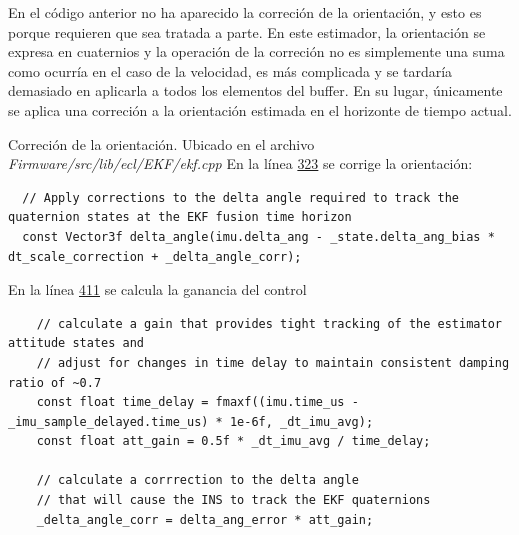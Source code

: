 En el código anterior no ha aparecido la correción de la orientación, y esto es porque requieren que sea tratada a parte. En este estimador, la orientación se expresa en cuaternios y la operación de la correción no es simplemente una suma como ocurría en el caso de la velocidad, es más complicada y se tardaría demasiado en aplicarla a todos los elementos del buffer. En su lugar, únicamente se aplica una correción a la orientación estimada en el horizonte de tiempo actual.

\begin{codigo}{Correción de la orientación. Ubicado en el archivo \textit{Firmware/src/lib/ecl/EKF/ekf.cpp}}
En la línea \href{https://github.com/PX4/PX4-ECL/blob/ec934908900b23ee273d1a9f82364b7b38423200/EKF/ekf.cpp\#L323}{323} se corrige la orientación:
\begin{verbatim}
  // Apply corrections to the delta angle required to track the quaternion states at the EKF fusion time horizon
  const Vector3f delta_angle(imu.delta_ang - _state.delta_ang_bias * dt_scale_correction + _delta_angle_corr);
\end{verbatim}
En la línea \href{https://github.com/PX4/PX4-ECL/blob/ec934908900b23ee273d1a9f82364b7b38423200/EKF/ekf.cpp\#L411}{411} se calcula la ganancia del control
\begin{verbatim}
    // calculate a gain that provides tight tracking of the estimator attitude states and
    // adjust for changes in time delay to maintain consistent damping ratio of ~0.7
    const float time_delay = fmaxf((imu.time_us - _imu_sample_delayed.time_us) * 1e-6f, _dt_imu_avg);
    const float att_gain = 0.5f * _dt_imu_avg / time_delay;
    
    // calculate a corrrection to the delta angle
    // that will cause the INS to track the EKF quaternions
    _delta_angle_corr = delta_ang_error * att_gain;
\end{verbatim}
\end{codigo} 


